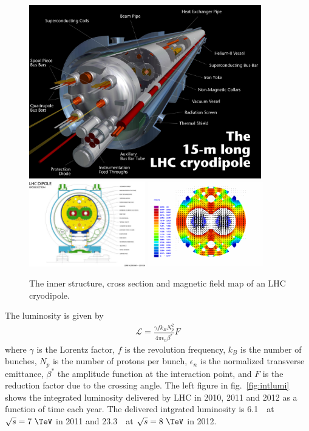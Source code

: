 
%
\begin{figure}[ht!] 
\centering 
\includegraphics[width=0.9\textwidth]{figures/cryodipole.jpg} 
\\
\vspace{1cm}
\includegraphics[width=0.45\textwidth]{figures/LHC-PHO-2001-187.jpg}
\includegraphics[width=0.45\textwidth]{figures/LHC-Dipole-Magnetic-Field.png}
\caption{The inner structure, cross section and magnetic field map of
an LHC cryodipole.} 
\label{fig:SCdipole} 
\end{figure} 

The luminosity is given by 
\begin{eqnarray} 
\mathcal{L} = \frac{\gamma f k_B N_p^2}{4 \pi \epsilon_n \beta^*} F 
\end{eqnarray} 
where $\gamma$ is the Lorentz factor, 
$f$ is the revolution frequency, 
$k_B$ is the number of bunches,
$N_p$ is the number of protons per bunch, 
$\epsilon_n$ is the normalized transverse emittance, 
$\beta^*$ the amplitude function at the interaction point, 
and $F$ is the reduction factor due to the crossing angle.
The left figure in fig.~\ref{fig:intlumi} shows the integrated luminosity 
delivered by LHC in 2010, 2011 and 2012 as a function of time each year. 
The delivered intgrated luminosity is 6.1~\ifb\ at $\sqrt{s}=7~\TeV$ in 2011
and 23.3~\ifb\ at $\sqrt{s}=8~\TeV$ in 2012. 

